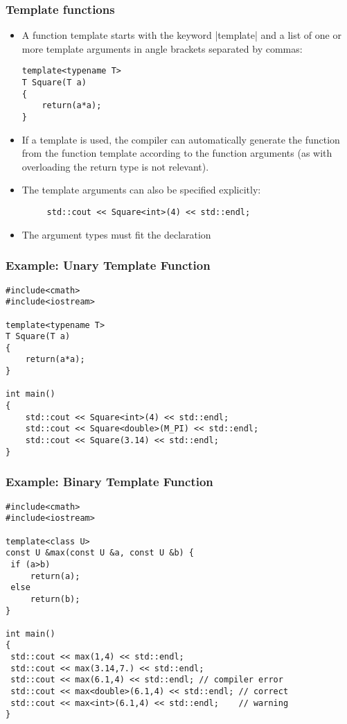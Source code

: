
\begin{frame}[fragile]
\frametitle{Template functions}
\begin{itemize}%
\item A function template starts with the keyword \inline|template| and a list of one or more template arguments
in angle brackets separated by commas:
\begin{lstlisting}
template<typename T>
T Square(T a)
{
    return(a*a);
}
\end{lstlisting}
\item If a template is used, the compiler can automatically generate the function from the function template according to the function arguments (as with overloading the return type is not relevant).
 \item The template arguments can also be specified explicitly:
 \begin{lstlisting}
     std::cout << Square<int>(4) << std::endl;
 \end{lstlisting}
 \item The argument types must fit the declaration
\end{itemize}
\end{frame}


\begin{frame}[fragile]
\frametitle{Example: Unary Template Function}
\begin{lstlisting}
#include<cmath>
#include<iostream>

template<typename T>
T Square(T a)
{
    return(a*a);
}

int main()
{
    std::cout << Square<int>(4) << std::endl;
    std::cout << Square<double>(M_PI) << std::endl;
    std::cout << Square(3.14) << std::endl;
}
\end{lstlisting}
\end{frame}


\begin{frame}[fragile]
\frametitle{Example: Binary Template Function}
\begin{lstlisting}
#include<cmath>
#include<iostream>

template<class U>
const U &max(const U &a, const U &b) {
 if (a>b)
     return(a);
 else
     return(b);
}

int main()
{
 std::cout << max(1,4) << std::endl;
 std::cout << max(3.14,7.) << std::endl;
 std::cout << max(6.1,4) << std::endl; // compiler error
 std::cout << max<double>(6.1,4) << std::endl; // correct
 std::cout << max<int>(6.1,4) << std::endl;    // warning
}
\end{lstlisting}
\end{frame}

